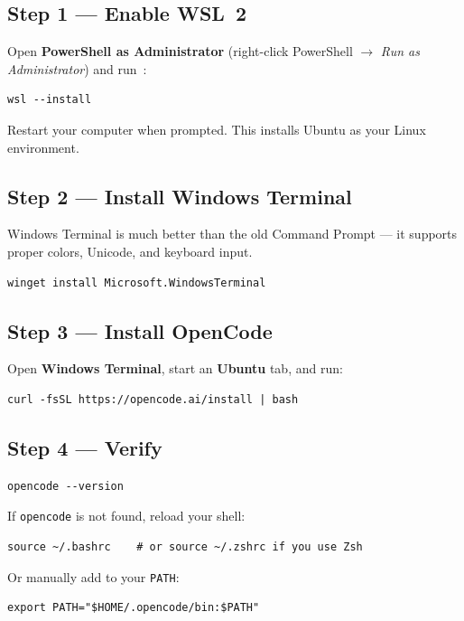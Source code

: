 \documentclass[11pt]{article}
\begin{document}
\subsection{Step 1 --- Enable WSL~2}

Open \textbf{PowerShell as Administrator} (right-click PowerShell $\to$ \emph{Run as Administrator}) and run~\cite{microsoft_wsl2026}:

\begin{lstlisting}[style=term]
wsl --install
\end{lstlisting}

Restart your computer when prompted.  This installs Ubuntu as your Linux environment.

\subsection{Step 2 --- Install Windows Terminal}

Windows Terminal is much better than the old Command Prompt --- it supports proper colors, Unicode, and keyboard input.

\begin{lstlisting}[style=term]
winget install Microsoft.WindowsTerminal
\end{lstlisting}

\subsection{Step 3 --- Install OpenCode}

Open \textbf{Windows Terminal}, start an \textbf{Ubuntu} tab, and run:

\begin{lstlisting}[style=term]
curl -fsSL https://opencode.ai/install | bash
\end{lstlisting}

\subsection{Step 4 --- Verify}

\begin{lstlisting}[style=term]
opencode --version
\end{lstlisting}

\begin{alert-box}
If \texttt{opencode} is not found, reload your shell:
\begin{lstlisting}[style=term]
source ~/.bashrc    # or source ~/.zshrc if you use Zsh
\end{lstlisting}
Or manually add to your \texttt{PATH}:
\begin{lstlisting}[style=term]
export PATH="$HOME/.opencode/bin:$PATH"
\end{lstlisting}
\end{alert-box}
\end{document}
